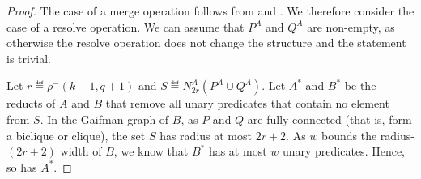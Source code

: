 \begin{proof}
    The case of a merge operation follows  from  and . We therefore consider the case of a resolve operation. We can assume that $P^A$ and $Q^A$ are non-empty, as otherwise the resolve operation does not change the structure and the statement is trivial.

%
%
%
%
    Let \(r\eqdef\rho^-(k-1,q+1)\) and \(S \eqdef N_{2r}^A(P^A \cup Q^A)\).
    Let \(A^*\) and \(B^*\) be the reducts of \(A\) and \(B\) that remove all unary predicates that contain no element from \(S\).
    In the Gaifman graph of \(B\), as \(P\) and \(Q\) are fully connected (that is, form a biclique or clique), the set \(S\) has radius at most \(2r+2\).
    As \(w\) bounds the radius-\((2r+2)\) width of \(B\), we know that \(B^*\) has at most \(w\) unary predicates.
    Hence, so has \(A^*\).


\end{proof}

